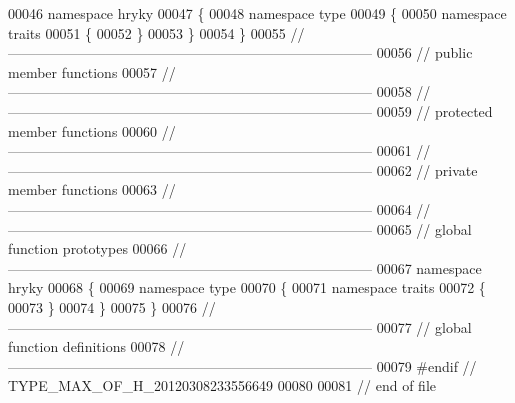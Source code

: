 \begin{DoxyCode}
00046 \textcolor{keyword}{namespace }hryky
00047 \{
00048 \textcolor{keyword}{namespace }type
00049 \{
00050 \textcolor{keyword}{namespace }traits
00051 \{
00052 \}
00053 \}
00054 \}
00055 \textcolor{comment}{//
      ------------------------------------------------------------------------------}
00056 \textcolor{comment}{// public member functions}
00057 \textcolor{comment}{//
      ------------------------------------------------------------------------------}
00058 \textcolor{comment}{//
      ------------------------------------------------------------------------------}
00059 \textcolor{comment}{// protected member functions}
00060 \textcolor{comment}{//
      ------------------------------------------------------------------------------}
00061 \textcolor{comment}{//
      ------------------------------------------------------------------------------}
00062 \textcolor{comment}{// private member functions}
00063 \textcolor{comment}{//
      ------------------------------------------------------------------------------}
00064 \textcolor{comment}{//
      ------------------------------------------------------------------------------}
00065 \textcolor{comment}{// global function prototypes}
00066 \textcolor{comment}{//
      ------------------------------------------------------------------------------}
00067 \textcolor{keyword}{namespace }hryky
00068 \{
00069 \textcolor{keyword}{namespace }type
00070 \{
00071 \textcolor{keyword}{namespace }traits
00072 \{
00073 \}
00074 \}
00075 \}
00076 \textcolor{comment}{//
      ------------------------------------------------------------------------------}
00077 \textcolor{comment}{// global function definitions}
00078 \textcolor{comment}{//
      ------------------------------------------------------------------------------}
00079 \textcolor{preprocessor}{#endif // TYPE\_MAX\_OF\_H\_20120308233556649}
00080 \textcolor{preprocessor}{}
00081 \textcolor{comment}{// end of file}
\end{DoxyCode}
